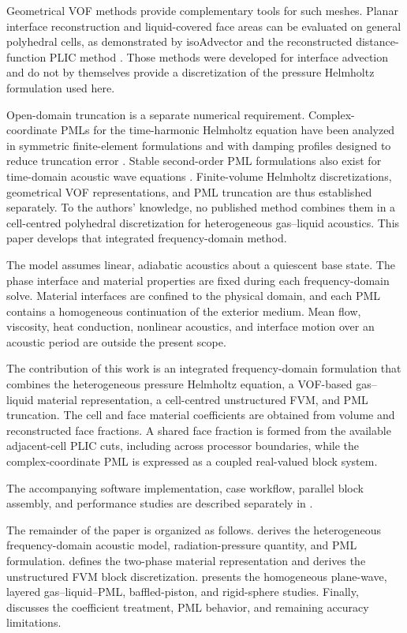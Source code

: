 \documentclass[final,12pt,nopreprintline,longtitle]{elsarticle}
\begin{document}
Geometrical VOF methods provide complementary tools for such meshes.  Planar
interface reconstruction and liquid-covered face areas can be evaluated on
general polyhedral cells, as demonstrated by isoAdvector and the reconstructed
distance-function PLIC method \cite{Roenby2016,Scheufler2019}.  Those methods
were developed for interface advection and do not by themselves provide a
discretization of the pressure Helmholtz formulation used here.

Open-domain truncation is a separate numerical requirement.  Complex-coordinate
PMLs for the time-harmonic Helmholtz equation have been analyzed in symmetric
finite-element formulations and with damping profiles designed to reduce
truncation error \cite{Harari2000,Bermudez2007}.  Stable second-order PML
formulations also exist for time-domain acoustic wave equations
\cite{Kaltenbacher2013modified}.  Finite-volume Helmholtz discretizations,
geometrical VOF representations, and PML truncation are thus established
separately.  To the authors' knowledge, no published method
combines them in a cell-centred polyhedral discretization for heterogeneous
gas--liquid acoustics.  This paper develops that integrated frequency-domain
method.

The model assumes linear, adiabatic acoustics about a quiescent base state.  The
phase interface and material properties are fixed during each frequency-domain
solve.  Material interfaces are confined to the physical domain, and each PML
contains a homogeneous continuation of the exterior medium.  Mean flow,
viscosity, heat conduction, nonlinear acoustics, and interface motion over an
acoustic period are outside the present scope.

The contribution of this work is an integrated frequency-domain formulation
that combines the heterogeneous pressure Helmholtz equation, a VOF-based
gas--liquid material representation, a cell-centred unstructured FVM, and PML
truncation.  The cell and face material coefficients are obtained from volume
and reconstructed face fractions.  A shared face fraction is formed from the
available adjacent-cell PLIC cuts, including across processor boundaries, while the
complex-coordinate PML is expressed as a coupled real-valued block system.

The accompanying software implementation, case workflow, parallel block
assembly, and performance studies are described separately in
\cite{Xu2026AcousticHelmholtzFoam}.

The remainder of the paper is organized as follows.   derives
the heterogeneous frequency-domain acoustic model, radiation-pressure
quantity, and PML formulation.   defines the two-phase
material representation and derives the unstructured FVM block discretization.
 presents the homogeneous plane-wave, layered
gas--liquid--PML, baffled-piston, and rigid-sphere studies.  Finally,
 discusses the coefficient treatment, PML behavior, and
remaining accuracy limitations.
\end{document}
